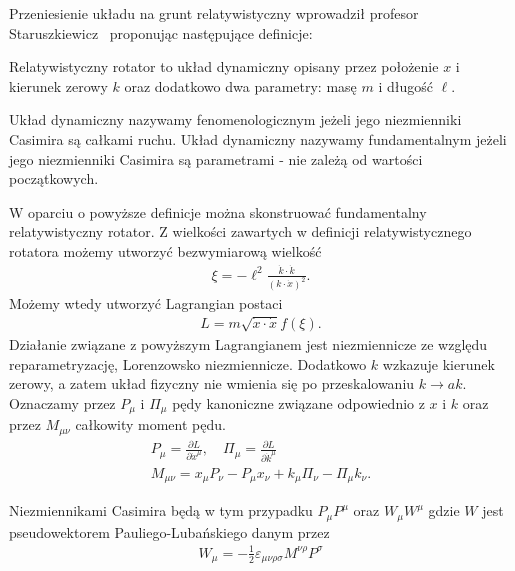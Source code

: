 Przeniesienie układu na grunt relatywistyczny wprowadził 
profesor Staruszkiewicz~\cite{star2008} proponując następujące 
definicje:
\begin{definition}
Relatywistyczny rotator to układ dynamiczny
 opisany przez położenie $x$ i kierunek
zerowy $k$ oraz dodatkowo dwa parametry: masę $m$ i długość $\ell$.
\end{definition}
\begin{definition}
Układ dynamiczny  nazywamy fenomenologicznym jeżeli jego niezmienniki Casimira są 
całkami ruchu. Układ dynamiczny nazywamy fundamentalnym jeżeli jego niezmienniki
Casimira są parametrami - nie zależą od wartości początkowych.
\end{definition}
W oparciu o powyższe definicje można skonstruować fundamentalny
relatywistyczny rotator. Z wielkości zawartych w definicji relatywistycznego 
rotatora możemy utworzyć bezwymiarową wielkość
\begin{align}
\xi = - \ell^2 \frac{\dot{k} \cdot \dot{k}}{ ( k \cdot \dot{x})^2 }.
\end{align}
Możemy wtedy utworzyć Lagrangian postaci
\begin{align}
L = m \sqrt{ \dot{x} \cdot \dot{x} } f( \xi ) .
\end{align}
Działanie związane z powyższym Lagrangianem 
jest niezmiennicze ze względu reparametryzację, 
Lorenzowsko niezmiennicze. Dodatkowo $k$ wzkazuje kierunek zerowy, a zatem
 układ fizyczny nie wmienia się
po przeskalowaniu $k \to a k$. 
Oznaczamy przez $P_\mu$ i $\Pi_\mu$ pędy kanoniczne związane 
odpowiednio z $x$ i $k$ oraz przez $M_{\mu\nu}$ całkowity moment pędu.
\begin{align}
P_\mu = \frac{\partial L}{\partial \dot{x}^\mu}, \quad
\Pi_\mu = \frac{\partial L}{\partial \dot{k}^\mu} \\
M_{\mu\nu} = x_\mu P_\nu - P_\mu x_\nu + k_\mu \Pi_\nu - \Pi_\mu k_\nu.
\end{align}

Niezmiennikami Casimira będą w tym przypadku $P_\mu P^\mu$ oraz
$W_\mu W^\mu$ gdzie $W$ jest pseudowektorem Pauliego-Lubańskiego 
danym przez
\begin{align}
W_\mu = - \frac{1}{2} \varepsilon_{\mu\nu\rho\sigma}
M^{\nu\rho} P^\sigma
\end{align}


